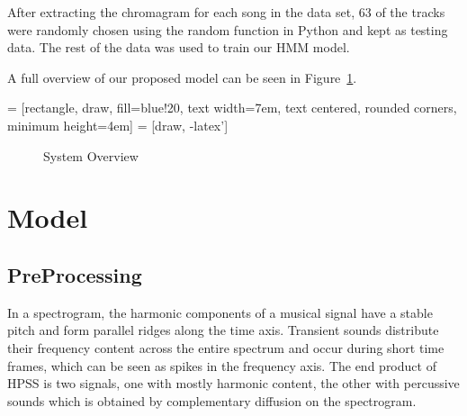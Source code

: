 \documentclass{article}
\begin{document}
After extracting the chromagram for each song in the data set, 63 of the tracks
were randomly chosen using the random function in Python and kept as testing
data. The rest of the data was used to train our HMM model.

A full overview of our proposed model can be seen in Figure~\ref{fig:overview}.

 = [rectangle, draw, fill=blue!20,
    text width=7em, text centered, rounded corners, minimum height=4em]
 = [draw, -latex']

\begin{figure}
\caption{System Overview}
\label{fig:overview}
\end{figure}

\section{Model}

\subsection{PreProcessing}

In a spectrogram, the harmonic components of a musical signal have a stable
pitch and form parallel ridges along the time axis. Transient sounds distribute
their frequency content across the entire spectrum and occur during short time
frames, which can be seen as spikes in the frequency axis. The end product of
HPSS is two signals, one with mostly harmonic content, the other with
percussive sounds which is obtained by complementary diffusion on the
spectrogram.
\end{document}
